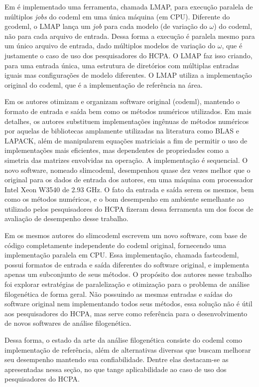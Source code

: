 \documentclass[cic,tc]{iiufrgs}
\begin{document}
Em \cite{maldonado2016lmap} é implementado uma
ferramenta, chamada LMAP, para execução paralela de múltiplos \textit{jobs} do
codeml em uma única máquina (em CPU). Diferente do gcodeml, o LMAP lança um
\textit{job} para cada modelo (de variação do $\omega$) do codeml, não para
cada arquivo de entrada. Dessa forma a execução é paralela mesmo para um único
arquivo de entrada, dado múltiplos modelos de variação do $\omega$, que é
justamente o caso de uso dos pesquisadores do HCPA. O LMAP faz isso criando,
para uma entrada única, uma estrutura de diretórios com múltiplas entradas
iguais mas configurações de modelo diferentes. O LMAP utiliza a implementação
original do codeml, que é a implementação de referência na área.

Em \cite{schabauer2012slimcodeml} os autores otimizam e organizam software
original (codeml), mantendo o formato de entrada e saída bem como os métodos
numéricos utilizados. Em mais detalhes, os autores substituem implementações
ingênuas de métodos numéricos por aquelas de bibliotecas amplamente utilizadas
na literatura como BLAS e LAPACK, além de manipularem equações matriciais a fim
de permitir o uso de implementações mais eficientes, mas dependentes de
propriedades como a simetria das matrizes envolvidas na operação. A
implementação é sequencial. O novo software, nomeado slimcodeml, desempenhou
quase dez vezes melhor que o original para os dados de entrada dos autores, em
uma máquina com processador Intel Xeon W3540 de 2.93 GHz. O fato da entrada e
saída serem os mesmos, bem como os métodos numéricos, e o bom desempenho em
ambiente semelhante ao utilizado pelos pesquisadores do HCPA fizeram dessa
ferramenta um dos focos de avaliação de desempenho desse trabalho.

Em \cite{valle2014optimization} os mesmos autores do slimcodeml escrevem um
novo software, com base de código completamente independente do codeml
original, fornecendo uma implementação paralela em CPU. Essa implementação,
chamada fastcodeml, possui formatos de entrada e saída diferentes do software
original, e implementa apenas um subconjunto de seus métodos. O propósito dos
autores nesse trabalho foi explorar estratégias de paralelização e otimização
para o problema de análise filogenética de forma geral. Não possuindo as mesmas
entradas e saídas do software original nem implementando todos seus métodos,
essa solução não é útil aos pesquisadores do HCPA, mas serve como referência
para o desenvolvimento de novos softwares de análise filogenética.

Dessa forma, o estado da arte da análise filogenética consiste do codeml como
implementação de referência, além de alternativas diversas que buscam melhorar
seu desempenho mantendo sua confiabilidade. Dentre elas destacam-se as
apresentadas nessa seção, no que tange aplicabilidade ao caso de uso dos
pesquisadores do HCPA.
\end{document}

